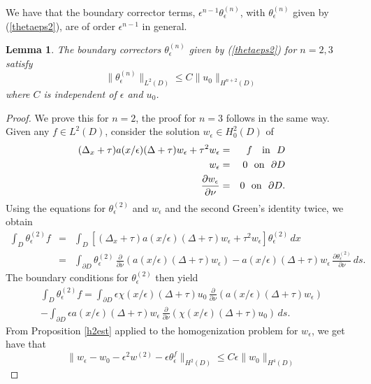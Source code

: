 \documentclass[10pt,a4paper]{amsart}
\newtheorem{lemma}{Lemma}
\begin{document}
\noindent
We have that the boundary corrector terms, $\epsilon^{n-1}\theta_\epsilon^{(n)}$, with $\theta_\epsilon^{(n)}$ given by (\ref{thetaeps2}), are of order $\epsilon^{n-1}$ in general. 
\begin{lemma}\label{bcbounds} The boundary correctors $\theta_\epsilon^{(n)}$ given by (\ref{thetaeps2})  for $n=2,3$ satisfy 
$$\| \theta_\epsilon^{(n)}\|_{L^2( D)} \leq C\| u_0 \|_{H^{n+2}( D)} $$
where $C$ is independent of $\epsilon$ and $u_0$. \end{lemma}
\begin{proof}  We prove this for $n=2$, the proof for $n=3$ follows in the same way. 
Given any $f\in L^2( D)$, consider the solution $w_\epsilon\in H^2_0( D)$ of 
\begin{eqnarray}  \label{wepseq} (\Delta_x +\tau) a(x/\epsilon) (\Delta +\tau) w_\epsilon +\tau^2 w_\epsilon&=& f \ \ \ \mbox{in}\ \  D \\ 
w_\epsilon &=& 0 \ \ \mbox{on}\ \ \partial D \nonumber \\ {\partial w_\epsilon} \over{\partial\nu}&=& 0 \ \ \mbox{on}\ \ \partial D.\end{eqnarray}
Using the equations for $\theta_\epsilon^{(2)}$ and $w_\epsilon$ and the second Green's identity twice,  we obtain
\begin{eqnarray}
\int_ D \theta_\epsilon^{(2)} f &=&\int_{ D} \left[(\Delta_x +\tau) a(x/\epsilon) (\Delta +\tau) w_\epsilon +\tau^2 w_\epsilon\right] \theta_\epsilon^{(2)}\,dx\nonumber\\
&=& \int_{\partial  D}\theta_\epsilon^{(2)} \, \frac{\partial}{\partial\nu} \left(a(x/\epsilon) (\Delta +\tau) w_\epsilon\right)- a(x/\epsilon) (\Delta +\tau) w_\epsilon \,\frac{\partial \theta_\epsilon^{(2)}}{\partial \nu} \, ds.
\end{eqnarray}
The boundary conditions for $\theta_\epsilon^{(2)}$  then yield
\begin{multline}\label{eqthetaafterbcs}
\int_ D \theta_\epsilon^{(2)} f =  \int_{\partial  D}\epsilon\chi(x/\epsilon)(\Delta +\tau)u_0 \, \frac{\partial}{\partial\nu}\left(  a(x/\epsilon) (\Delta +\tau) w_\epsilon\right)\\ - \int_{\partial D} \epsilon a(x/\epsilon) (\Delta +\tau) w_\epsilon \,\frac{\partial}{\partial\nu} \left(\chi(x/\epsilon)(\Delta +\tau)u_0\right) \, ds.
\end{multline}
From Proposition \ref{h2est} applied to the homogenization problem for $w_\epsilon$, we get have that 
\begin{equation}\label{l2estlapwiththeta} \| w_\epsilon - w_0 -\epsilon^2 w^{(2)} - \epsilon \theta^f_\epsilon \|_{H^2( D)} \leq C\epsilon \| w_0\|_{H^4( D)} \end{equation}

\end{proof}
\end{document}

